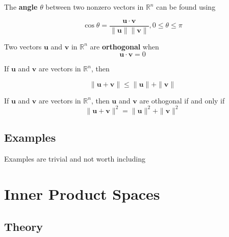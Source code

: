 \documentclass{report}
\begin{document}
\begin{tcolorbox}[title = Definition of the Angle Between Two Vectors in $\mathbb{R}^n$]
	The \textbf{angle} $\theta$ between two nonzero vectors in $\mathbb{R}^n$ can be found using
	
	$$
	\cos{\theta} = \frac{\bm{u} \cdot \bm{v}}{\|\bm{u} \| \|\bm{v} \|}, 0 \le \theta \le \pi
	$$
\end{tcolorbox}

\begin{tcolorbox}[title = Definition of Orthogonal Vectors]
		Two vectors $\bm{u}$ and $\bm{v}$ in $\mathbb{R}^n$ are \textbf{orthogonal} when
		$$
		\bm{u} \cdot \bm{v} = 0
		$$
\end{tcolorbox}

\begin{tcolorbox}[title = The Triangle Inequality]
	If $\bm{u}$ and $\bm{v}$ are vectors in $\mathbb{R}^n$, then
	
	$$
	\| \bm{u} + \bm{v} \| \le \|\bm{u} \| + \| \bm{v} \|
	$$
\end{tcolorbox}

\begin{tcolorbox}[title = The Pythagorean Theorem]
	If $\bm{u}$ and $\bm{v}$ are vectors in $\mathbb{R}^n$, then $\bm{u}$ and $\bm{v}$ are othogonal if and only if
	$$
	\| \bm{u} + \bm{v} \| ^2 = \| \bm{u} \| ^2 + \| \bm{v} \| ^2 
	$$
\end{tcolorbox}

\subsection{Examples}

Examples are trivial and not worth including

\section{Inner Product Spaces}

\subsection{Theory}
\end{document}
